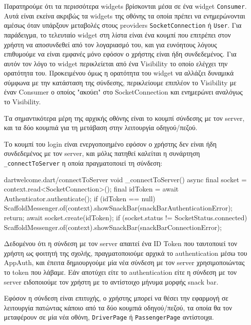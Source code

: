 \documentclass[../thesis.tex]{subfiles}
\begin{document}
Παρατηρούμε ότι τα περισσότερα widgets βρίσκονται μέσα σε ένα widget \texttt{Consumer}.
Αυτά είναι εκείνα ακριβώς τα widgets της οθόνης τα οποία πρέπει να ενημερώνονται αμέσως όταν υπάρξουν μεταβολές στους providers \texttt{SocketConnection} ή \texttt{User}.
Για παράδειγμα, το τελευταίο widget στη λίστα είναι ένα κουμπί που επιτρέπει στον χρήστη να αποσυνδεθεί από τον λογαριασμό του, και για ευνόητους λόγους επιθυμούμε να είναι εμφανές μόνο εφόσον ο χρήστης είναι ήδη συνδεδεμένος.
Για αυτόν τον λόγο το widget περικλείεται από ένα Visibility το οποίο ελέγχει την ορατότητα του.
Προκειμένου όμως η ορατότητα του widget να αλλάζει δυναμικά σύμφωνα με την κατάσταση της σύνδεσης, περικλείουμε επιπλέον το Visibility με έναν Consumer ο οποίος "ακούει" στο SocketConnection και ενημερώνει αναλόγως το Visibility.

Τα σημαντικότερα μέρη της αρχικής οθόνης είναι το κουμπί σύνδεσης με τον server, και τα δύο κουμπιά για τη μετάβαση στην λειτουργία οδηγού/πεζού.

Το κουμπί του login είναι ενεργοποιημένο εφόσον ο χρήστης δεν είναι ήδη συνδεδεμένος με τον server, και μόλις πατηθεί καλείται η συνάρτηση \texttt{_connectToServer} η οποία πραγματοποιεί τη σύνδεση:

\begin{codeblock}{dart}{welcome.dart/connectToServer}
  void _connectToServer() async {
    final socket = context.read<SocketConnection>();
    final idToken = await Authenticator.authenticate();
    if (idToken == null) {
      ScaffoldMessenger.of(context).showSnackBar(snackBarAuthenticationError);
      return;
    }
    await socket.create(idToken);
    if (socket.status != SocketStatus.connected) {
      ScaffoldMessenger.of(context).showSnackBar(snackBarConnectionError);
    }
  }
\end{codeblock}

Δεδομένου ότι η σύνδεση με τον server απαιτεί ένα ID Token που ταυτοποιεί τον χρήστη ως φοιτητή της σχολής, πραγματοποιούμε αρχικά το authentication μέσω του AppAuth, και έπειτα δημιουργούμε μία νέα σύνδεση με τον server χρησιμοποιώντας το token που λάβαμε.
Εάν αποτύχει είτε το authentication είτε η σύνδεση με τον server ειδοποιούμε τον χρήστη με το αντίστοιχο μήνυμα μορφής snack bar.

Εφόσον η σύνδεση είναι επιτυχής, ο χρήστης μπορεί να θέσει την εφαρμογή σε λειτουργία πατώντας κάποιο από τα δύο κουμπιά οδηγού/πεζού, τα οποία θα τον μεταφέρουν σε μία νέα οθόνη, \texttt{DriverPage} ή \texttt{PassengerPage} αντίστοιχα.
\end{document}
